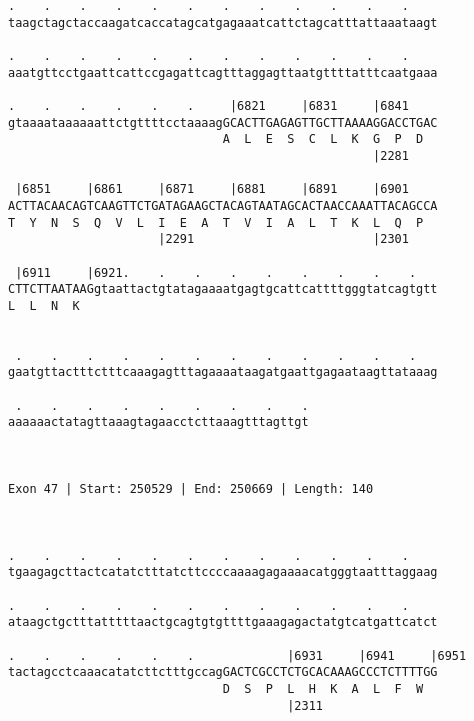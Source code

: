 \documentclass{article}
\begin{document}
\begin{Verbatim}
.    .    .    .    .    .    .    .    .    .    .    .    
taagctagctaccaagatcaccatagcatgagaaatcattctagcatttattaaataagt
                                                            
.    .    .    .    .    .    .    .    .    .    .    .    
aaatgttcctgaattcattccgagattcagtttaggagttaatgttttatttcaatgaaa
                                                            
.    .    .    .    .    .     |6821     |6831     |6841    
gtaaaataaaaaattctgttttcctaaaagGCACTTGAGAGTTGCTTAAAAGGACCTGAC
                              A  L  E  S  C  L  K  G  P  D  
                                                   |2281    
  
 |6851     |6861     |6871     |6881     |6891     |6901    
ACTTACAACAGTCAAGTTCTGATAGAAGCTACAGTAATAGCACTAACCAAATTACAGCCA
T  Y  N  S  Q  V  L  I  E  A  T  V  I  A  L  T  K  L  Q  P  
                     |2291                         |2301    
  
 |6911     |6921.    .    .    .    .    .    .    .    .   
CTTCTTAATAAGgtaattactgtatagaaaatgagtgcattcattttgggtatcagtgtt
L  L  N  K                                                  
                                                            
  
 .    .    .    .    .    .    .    .    .    .    .    .   
gaatgttactttctttcaaagagtttagaaaataagatgaattgagaataagttataaag
                                                            
 .    .    .    .    .    .    .    .    .
aaaaaactatagttaaagtagaacctcttaaagtttagttgt
                                          
                                          
 
Exon 47 | Start: 250529 | End: 250669 | Length: 140



.    .    .    .    .    .    .    .    .    .    .    .    
tgaagagcttactcatatctttatcttccccaaaagagaaaacatgggtaatttaggaag
                                                            
.    .    .    .    .    .    .    .    .    .    .    .    
ataagctgctttatttttaactgcagtgtgttttgaaagagactatgtcatgattcatct
                                                            
.    .    .    .    .    .             |6931     |6941     |6951
tactagcctcaaacatatcttctttgccagGACTCGCCTCTGCACAAAGCCCTCTTTTGG
                              D  S  P  L  H  K  A  L  F  W  
                                       |2311                
  

\end{Verbatim}
\end{document}

